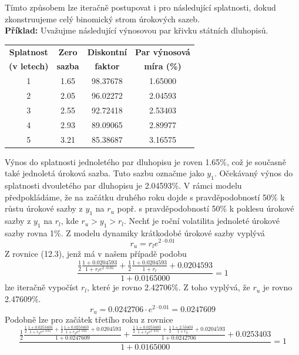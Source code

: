 \documentclass[a4paper]{book}
\begin{document}
Tímto způsobem lze iteračně postupovat i pro následující splatnosti, dokud zkonstruujeme celý binomický strom úrokových sazeb.\\

\noindent \textbf{Příklad:} Uvažujme následující výnosovou par křivku státních dluhopisů.
\begin{center}
\begin{tabular}{c c c c}
\textbf{Splatnost} & \textbf{Zero} & \textbf{Diskontní} & \textbf{Par výnosová}\\
\textbf{(v letech)} & \textbf{sazba} & \textbf{faktor} & \textbf{míra (\%)}\\
\hline
1 & 1.65 & 98.37678 & 1.65000 \\
2 & 2.05 & 96.02272 & 2.04593 \\
3 & 2.55 & 92.72418 & 2.53403 \\
4 & 2.93 & 89.09065 & 2.89977 \\
5 & 3.21 & 85.38687 & 3.16575
\end{tabular}
\end{center}
Výnos do splatnosti jednoletého par dluhopisu je roven 1.65\%, což je současně také jednoletá úroková sazba. Tuto sazbu označme jako $y_1$. Očekávaný výnos do splatnosti dvouletého par dluhopisu je 2.04593\%. V rámci modelu předpokládáme, že na začátku druhého roku dojde s pravděpodobností 50\% k růstu úrokové sazby z $y_1$ na $r_u$ popř. s pravděpodobností 50\% k poklesu úrokové sazby z $y_1$ na $r_l$, kde $r_u > y_1 > r_l$. Nechť je roční volatilita jednoleté úrokové sazby rovna 1\%. Z modelu dynamiky krátkodobé úrokové sazby vyplývá
\begin{equation*}
r_u = r_l e^{2 \cdot 0.01}
\end{equation*}
Z rovnice (12.3), jenž má v našem případě podobu
\begin{equation*}
\frac{\frac{1}{2}\frac{1 + 0.0204593}{1 + r_l e^{2 \cdot 0.01}} + \frac{1}{2}\frac{1 + 0.0204593}{1 + r_l} + 0.0204593}{1 + 0.0165000} = 1
\end{equation*}
lze iteračně vypočíst $r_l$, které je rovno 2.42706\%. Z toho vyplývá, že $r_u$ je rovno 2.47609\%.
\begin{equation*}
r_u = 0.0242706 \cdot e^{2 \cdot 0.01} = 0.0247609
\end{equation*}
Podobně lze pro začátek třetího roku z rovnice
\begin{equation*}
\frac{\frac{1}{2}\frac{\frac{1}{2}\frac{1 + 0.0253403}{1 + r_{ll} e^{4 \cdot 0.01}} + \frac{1}{2}\frac{1 + 0.0253403}{1 + r_{ll} e^{2 \cdot 0.01}} + 0.0204593}{1 + 0.0247609}  + \frac{\frac{1}{2}\frac{1 + 0.0253403}{1 + r_{ll} e^{2 \cdot 0.01}} + \frac{1}{2}\frac{1 + 2.53403}{1 + r_{ll}} + 0.0204593}{1 + 0.0242706} + 0.0253403}{1 + 0.0165000} = 1
\end{equation*}
\end{document}
